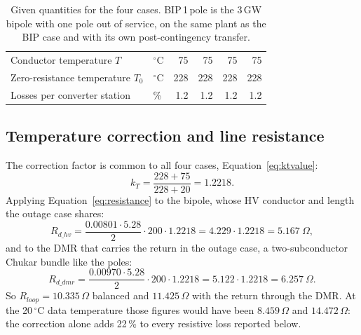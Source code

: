 \begin{table}[!ht]
\begin{tabularx}{\linewidth}{@{}X l r r r r@{}}
    Conductor temperature $T$     & $^{\circ}$C       & 75      & 75      & 75      & 75      \\
    Zero-resistance temperature $T_{0}$ & $^{\circ}$C & 228     & 228     & 228     & 228     \\
    Losses per converter station  & \%                & 1.2     & 1.2     & 1.2     & 1.2     \\
    \bottomrule
  \end{tabularx}
  \caption{Given quantities for the four cases. BIP\,1\,pole is the 3\,GW
           bipole with one pole out of service, on the same plant as the BIP
           case and with its own post-contingency transfer.}
  \label{tab:refinputs}
\end{table}

\subsection{Temperature correction and line resistance}
The correction factor is common to all four cases,
Equation~\eqref{eq:ktvalue}:
\[
  k_{T} = \frac{228+75}{228+20} = 1.2218 .
\]
Applying Equation~\eqref{eq:resistance} to the bipole, whose HV conductor and
length the outage case shares:
\[
  R_{d\_hv} = \frac{0.00801\cdot 5.28}{2}\cdot 200 \cdot 1.2218
         = 4.229 \cdot 1.2218 = 5.167\ \Omega,
\]
and to the DMR that carries the return in the outage case, a two-subconductor
Chukar bundle like the poles:
\[
  R_{d\_dmr} = \frac{0.00970\cdot 5.28}{2}\cdot 200 \cdot 1.2218
          = 5.122 \cdot 1.2218 = 6.257\ \Omega .
\]
So $R_{loop} = 10.335\,\Omega$ balanced and $11.425\,\Omega$ with the return
through the DMR. At the 20\,$^{\circ}$C data temperature those figures would
have been $8.459\,\Omega$ and $14.472\,\Omega$: the correction alone adds
22\,\% to every resistive loss reported below.

